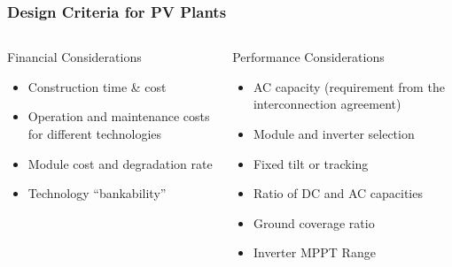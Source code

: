 \documentclass[aspectratio=169]{beamer}
\begin{document}
\begin{frame}
  \frametitle{Design Criteria for PV Plants}
  \begin{columns}[t]
    \begin{block}{Financial Considerations}
      \begin{itemize}
      \item Construction time \& cost
      \item Operation and maintenance costs for different technologies
      \item Module cost and degradation rate
      \item Technology ``bankability''
      \end{itemize}
    \end{block}

    \begin{block}{Performance Considerations}
      \begin{itemize}
      \item AC capacity (requirement from the interconnection agreement)
      \item Module and inverter selection
      \item Fixed tilt or tracking
      \item Ratio of DC and AC capacities
      \item Ground coverage ratio
      \item Inverter MPPT Range
      \end{itemize}
    \end{block}
  \end{columns}
\end{frame}
\end{document}
